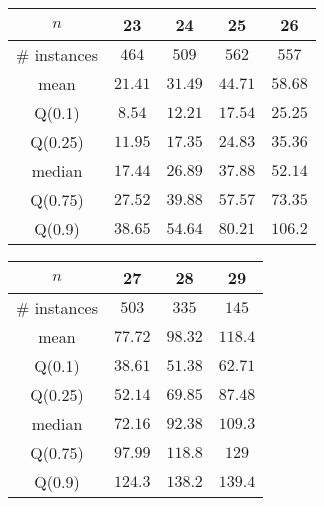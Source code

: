 \begin{tabular}{c|cccc} 
\hline 
$n$ & 23 & 24 & 25 & 26 \tabularnewline 
\hline 
\hline 
\# instances & $464$ & $509$ & $562$ & $557$ \tabularnewline 
mean & $21.41$ & $31.49$ & $44.71$ & $58.68$ \tabularnewline 
Q(0.1) & $8.54$ & $12.21$ & $17.54$ & $25.25$ \tabularnewline 
Q(0.25) & $11.95$ & $17.35$ & $24.83$ & $35.36$ \tabularnewline 
median & $17.44$ & $26.89$ & $37.88$ & $52.14$ \tabularnewline 
Q(0.75) & $27.52$ & $39.88$ & $57.57$ & $73.35$ \tabularnewline 
Q(0.9) & $38.65$ & $54.64$ & $80.21$ & $106.2$ \tabularnewline 
\hline 
\end{tabular} 
\medskip{} 

\begin{tabular}{c|ccc} 
\hline 
$n$ & 27 & 28 & 29 \tabularnewline 
\hline 
\hline 
\# instances & $503$ & $335$ & $145$ \tabularnewline 
mean & $77.72$ & $98.32$ & $118.4$ \tabularnewline 
Q(0.1) & $38.61$ & $51.38$ & $62.71$ \tabularnewline 
Q(0.25) & $52.14$ & $69.85$ & $87.48$ \tabularnewline 
median & $72.16$ & $92.38$ & $109.3$ \tabularnewline 
Q(0.75) & $97.99$ & $118.8$ & $129$ \tabularnewline 
Q(0.9) & $124.3$ & $138.2$ & $139.4$ \tabularnewline 
\hline 
\end{tabular} 
\medskip{} 

